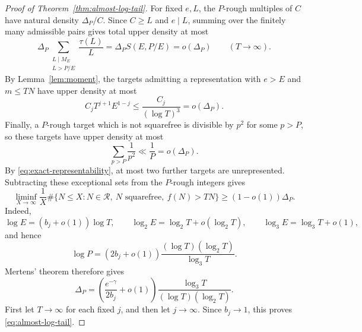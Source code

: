 \documentclass[11pt]{article}
\theoremstyle{remark}
\newcommand{\Rcal}{\mathcal R}
\newcommand{\1}{\mathbf 1}
\begin{document}
\begin{proof}[Proof of Theorem~\ref{thm:almost-log-tail}]
For fixed $e,L$, the $P$-rough multiples of $C$ have natural density
$\Delta_P/C$.  Since $C\geq L$ and $e\mid L$, summing over the finitely many
admissible pairs gives total upper density at most
\[
 \Delta_P\sum_{\substack{L\mid M_E\\L>P/E}}\frac{\tau(L)}L
 =\Delta_P S(E,P/E)=o(\Delta_P)
 \qquad(T\to\infty).
\]
By Lemma~\ref{lem:moment}, the targets admitting a representation with
$e>E$ and $m\leq TN$ have upper density at most
\[
 C_jT^{j+1}E^{1-j}
 \leq\frac{C_j}{(\log T)^3}=o(\Delta_P).
\]
Finally, a $P$-rough target which is not squarefree is divisible by $p^2$ for
some $p>P$, so these targets have upper density at most
\[
 \sum_{p>P}\frac1{p^2}\ll\frac1P=o(\Delta_P).
\]
By \eqref{eq:exact-representability}, at most two further targets are
unrepresented.  Subtracting these exceptional sets from the $P$-rough
integers gives
\[
 \liminf_{X\to\infty}\frac1X
 \#\{N\leq X:N\in\Rcal,\ N\text{ squarefree},\ f(N)>TN\}
 \geq(1-o(1))\Delta_P.
\]
Indeed,
\[
 \log E=(b_j+o(1))\log T,\qquad
 \log_2E=\log_2T+o(\log_2T),\qquad
 \log_3E=\log_3T+o(1),
\]
and hence
\[
 \log P=(2b_j+o(1))
          \frac{(\log T)(\log_2T)}{\log_3T}.
\]
Mertens' theorem therefore gives
\[
 \Delta_P
 =\left(\frac{e^{-\gamma}}{2b_j}+o(1)\right)
       \frac{\log_3T}{(\log T)(\log_2T)}.
\]
First let $T\to\infty$ for each fixed $j$, and then let $j\to\infty$.
Since $b_j\to1$, this proves \eqref{eq:almost-log-tail}.
\end{proof}
\end{document}
